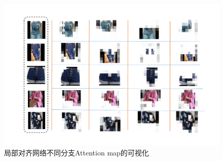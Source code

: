\begin{figure}[h]
  \centering
  \centerline{\includegraphics[width=1.2\linewidth]{Img/part-vis.pdf}}
  \caption{局部对齐网络不同分支Attention map的可视化}
  \label{fig:part-vis}
\end{figure}
